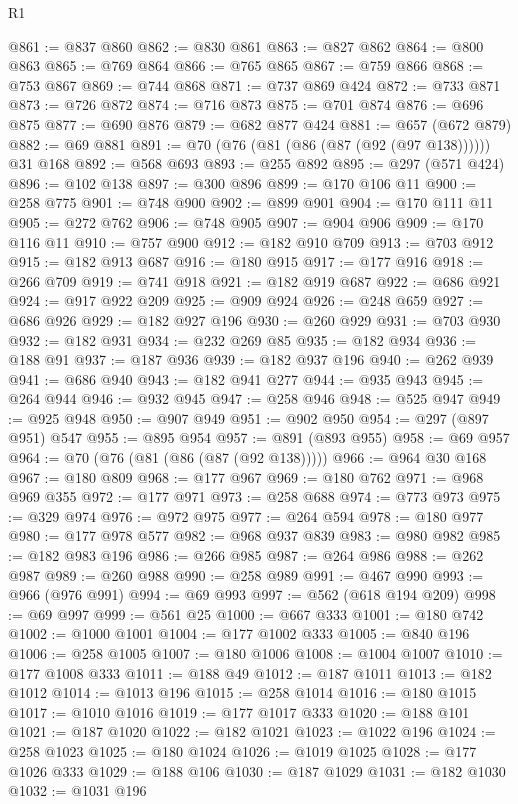 \begin{lexlean}{R1}
\begin{coremodule}
@861 := @837 @860
@862 := @830 @861
@863 := @827 @862
@864 := @800 @863
@865 := @769 @864
@866 := @765 @865
@867 := @759 @866
@868 := @753 @867
@869 := @744 @868
@871 := @737 @869 @424
@872 := @733 @871
@873 := @726 @872
@874 := @716 @873
@875 := @701 @874
@876 := @696 @875
@877 := @690 @876
@879 := @682 @877 @424
@881 := @657 (@672 @879)
@882 := @69 @881
@891 := @70 (@76 (@81 (@86 (@87 (@92 (@97 @138)))))) @31 @168
@892 := @568 @693
@893 := @255 @892
@895 := @297 (@571 @424)
@896 := @102 @138
@897 := @300 @896
@899 := @170 @106 @11
@900 := @258 @775
@901 := @748 @900
@902 := @899 @901
@904 := @170 @111 @11
@905 := @272 @762
@906 := @748 @905
@907 := @904 @906
@909 := @170 @116 @11
@910 := @757 @900
@912 := @182 @910 @709
@913 := @703 @912
@915 := @182 @913 @687
@916 := @180 @915
@917 := @177 @916
@918 := @266 @709
@919 := @741 @918
@921 := @182 @919 @687
@922 := @686 @921
@924 := @917 @922 @209
@925 := @909 @924
@926 := @248 @659
@927 := @686 @926
@929 := @182 @927 @196
@930 := @260 @929
@931 := @703 @930
@932 := @182 @931
@934 := @232 @269 @85
@935 := @182 @934
@936 := @188 @91
@937 := @187 @936
@939 := @182 @937 @196
@940 := @262 @939
@941 := @686 @940
@943 := @182 @941 @277
@944 := @935 @943
@945 := @264 @944
@946 := @932 @945
@947 := @258 @946
@948 := @525 @947
@949 := @925 @948
@950 := @907 @949
@951 := @902 @950
@954 := @297 (@897 @951) @547
@955 := @895 @954
@957 := @891 (@893 @955)
@958 := @69 @957
@964 := @70 (@76 (@81 (@86 (@87 (@92 @138)))))
@966 := @964 @30 @168
@967 := @180 @809
@968 := @177 @967
@969 := @180 @762
@971 := @968 @969 @355
@972 := @177 @971
@973 := @258 @688
@974 := @773 @973
@975 := @329 @974
@976 := @972 @975
@977 := @264 @594
@978 := @180 @977
@980 := @177 @978 @577
@982 := @968 @937 @839
@983 := @980 @982
@985 := @182 @983 @196
@986 := @266 @985
@987 := @264 @986
@988 := @262 @987
@989 := @260 @988
@990 := @258 @989
@991 := @467 @990
@993 := @966 (@976 @991)
@994 := @69 @993
@997 := @562 (@618 @194 @209)
@998 := @69 @997
@999 := @561 @25
@1000 := @667 @333
@1001 := @180 @742
@1002 := @1000 @1001
@1004 := @177 @1002 @333
@1005 := @840 @196
@1006 := @258 @1005
@1007 := @180 @1006
@1008 := @1004 @1007
@1010 := @177 @1008 @333
@1011 := @188 @49
@1012 := @187 @1011
@1013 := @182 @1012
@1014 := @1013 @196
@1015 := @258 @1014
@1016 := @180 @1015
@1017 := @1010 @1016
@1019 := @177 @1017 @333
@1020 := @188 @101
@1021 := @187 @1020
@1022 := @182 @1021
@1023 := @1022 @196
@1024 := @258 @1023
@1025 := @180 @1024
@1026 := @1019 @1025
@1028 := @177 @1026 @333
@1029 := @188 @106
@1030 := @187 @1029
@1031 := @182 @1030
@1032 := @1031 @196

\end{coremodule}
\end{lexlean}
